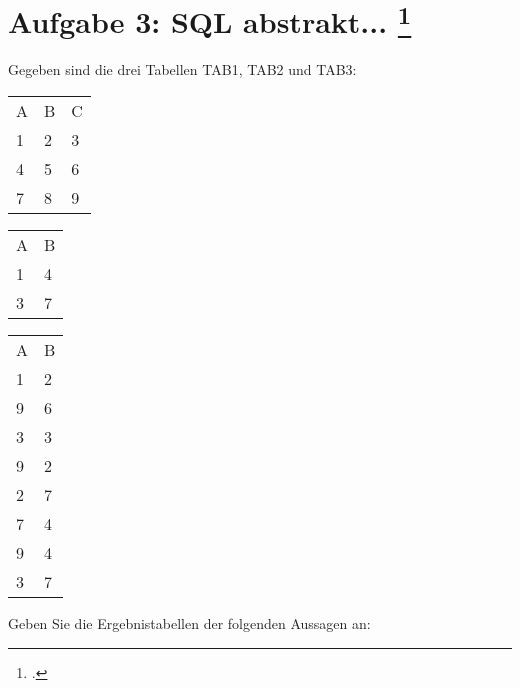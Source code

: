 \documentclass{bschlangaul-aufgabe}
\begin{document}

\section{Aufgabe 3: SQL abstrakt...
\footcite{db:ab:3}
}

Gegeben sind die drei Tabellen TAB1, TAB2 und TAB3:


\begin{tabular}{lll}
A&B&C\\
1&2&3\\
4&5&6\\
7&8&9\\
\end{tabular}


\begin{tabular}{ll}
A&B\\
1&4\\
3&7\\
\end{tabular}


\begin{tabular}{ll}
A&B\\
1&2\\
9&6\\
3&3\\
9&2\\
2&7\\
7&4\\
9&4\\
3&7\\
\end{tabular}

\bigskip

Geben Sie die Ergebnistabellen der folgenden Aussagen an:
\end{document}
